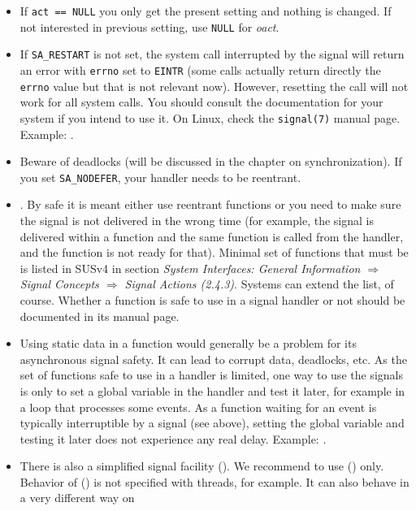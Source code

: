 \begin{itemize}
\item If \texttt{act == NULL} you only get the present setting and nothing is
changed.  If not interested in previous setting, use \texttt{NULL} for
\emph{oact}.
\item If \texttt{SA\_RESTART} is not set, the system call interrupted by the
signal will return an error with \texttt{errno} set to \texttt{EINTR} (some
calls actually return directly the \texttt{errno} value but that is not relevant
now).  However, resetting the call will not work for all system calls.  You
should consult the documentation for your system if you intend to use it.
On Linux, check the \texttt{signal(7)} manual page.  Example:
.
\item Beware of deadlocks (will be discussed in the chapter on synchronization).
If you set \texttt{SA\_NODEFER}, your handler needs to be reentrant.
\item \label{ASYNCSIGNALSAFE} .  By safe it is meant either use reentrant functions or you need
to make sure the signal is not delivered in the wrong time (for example, the
signal is delivered within a function and the same function is called from the
handler, and the function is not ready for that).  Minimal set of functions
that must be  is listed in SUSv4 in section
\emph{System Interfaces: General Information $\Rightarrow$ Signal Concepts
$\Rightarrow$ Signal Actions (2.4.3)}.  Systems can extend the list, of course.
Whether a function is safe to use in a signal handler or not should be
documented in its manual page.
\item Using static data in a function would generally be a problem for its
asynchronous signal safety.  It can lead to corrupt data, deadlocks, etc.  As
the set of functions safe to use in a handler is limited, one way to use the
signals is only to set a global variable in the handler and test it later, for
example in a loop that processes some events.  As a function waiting for an
event is typically interruptible by a signal (see above), setting the global
variable and testing it later does not experience any real delay.  Example:
.
\item There is also a simplified signal facility ().  We recommend
to use () only.  Behavior of () is not specified
with threads, for example.  It can also behave in a very different way on

\end{itemize}
